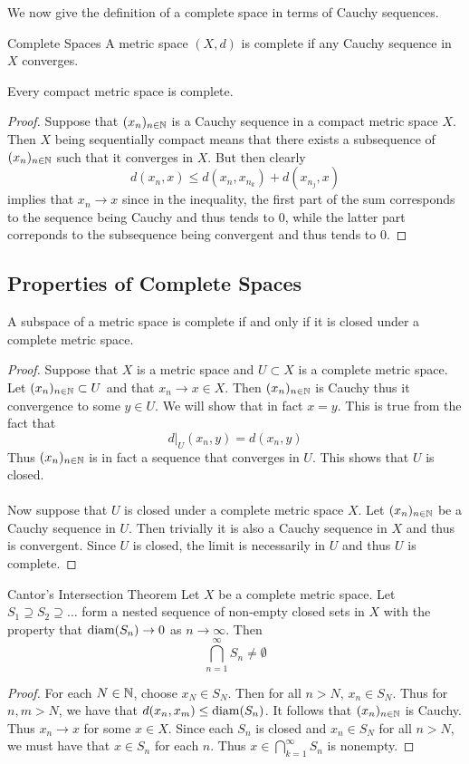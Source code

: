 \documentclass[a4paper]{article}
\begin{document}
We now give the definition of a complete space in terms of Cauchy sequences. 

\begin{defn}{Complete Spaces}{} A metric space $(X,d)$ is complete if any Cauchy sequence in $X$ converges. 
\end{defn}

\begin{prp}{}{} Every compact metric space is complete. \tcbline
\begin{proof}
Suppose that $(x_n)_{n\in\mathbb{N}}$ is a Cauchy sequence in a compact metric space $X$. Then $X$ being sequentially compact means that there exists a subsequence of $(x_n)_{n\in\mathbb{N}}$ such that it converges in $X$. But then clearly $$d(x_n,x)\leq d(x_n,x_{n_k})+d(x_{n_j},x)$$ implies that $x_n\to x$ since in the inequality, the first part of the sum corresponds to the sequence being Cauchy and thus tends to $0$, while the latter part correponds to the subsequence being convergent and thus tends to $0$. 
\end{proof}
\end{prp}

\subsection{Properties of Complete Spaces}
\begin{prp}{}{} A subspace of a metric space is complete if and only if it is closed under a complete metric space. \tcbline
\begin{proof}
Suppose that $X$ is a metric space and $U\subset X$ is a complete metric space. Let $(x_n)_{n\in\mathbb{N}}\subset U$ and that $x_n\to x\in X$. Then $(x_n)_{n\in\mathbb{N}}$ is Cauchy thus it convergence to some $y\in U$. We will show that in fact $x=y$. This is true from the fact that $$d|_U(x_n,y)=d(x_n,y)$$ Thus $(x_n)_{n\in\mathbb{N}}$ is in fact a sequence that converges in $U$. This shows that $U$ is closed. \\~\\
Now suppose that $U$ is closed under a complete metric space $X$. Let $(x_n)_{n\in\mathbb{N}}$ be a Cauchy sequence in $U$. Then trivially it is also a Cauchy sequence in $X$ and thus is convergent. Since $U$ is closed, the limit is necessarily in $U$ and thus $U$ is complete. 
\end{proof}
\end{prp}

\begin{thm}{Cantor's Intersection Theorem}{} Let $X$ be a complete metric space. Let $S_1\supseteq S_2\supseteq\dots$ form a nested sequence of non-empty closed sets in $X$ with the property that $\operatorname{diam}(S_n)\to 0$ as $n\to\infty$. Then $$\bigcap_{n=1}^\infty S_n\neq\emptyset$$ \tcbline
\begin{proof}
For each $N\in\mathbb{N}$, choose $x_N\in S_N$. Then for all $n>N$, $x_n\in S_N$. Thus for $n,m>N$, we have that $d(x_n,x_m)\leq\operatorname{diam}(S_n)$. It follows that $(x_n)_{n\in\mathbb{N}}$ is Cauchy. Thus $x_n\to x$ for some $x\in X$. Since each $S_n$ is closed and $x_n\in S_N$ for all $n>N$, we must have that $x\in S_n$ for each $n$. Thus $x\in\bigcap_{k=1}^\infty S_n$ is nonempty. 
\end{proof}
\end{thm}
\end{document}
